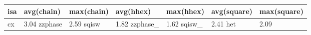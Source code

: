 \begin{tabular}{lllllll}
\toprule
isa & avg(chain) & max(chain) & avg(hhex) & max(hhex) & avg(square) & max(square) \\
\midrule
cx & 3.04%
zzphase & 2.59%
sqisw & 1.82%
zzphase_ & 1.62%
sqisw_ & 2.41%
het & 2.09%
\bottomrule
\end{tabular}
